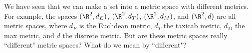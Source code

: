 \label{chap:equivalent_metric_spaces}


\vspace*{-17 pt}
\framebox{\hspace*{3 pt}
\parbox{4.7 in}{\begin{fqs}
\item 

\end{fqs}} \hspace*{3 pt}}

\vspace*{13 pt}

\label{sec_equiv_metric_intro}

We have seen that we can make a set into a metric space with different metrics. For example, the spaces $(\R^2, d_E)$, $(\R^2, d_T)$, $(\R^2, d_M)$, and $(\R^2, d)$ are all metric spaces, where $d_E$ is the Euclidean metric, $d_T$ the taxicab metric, $d_M$ the max metric, and $d$ the discrete metric. But are these metric spaces really ``different" metric spaces? What do we mean by ``different"? 


